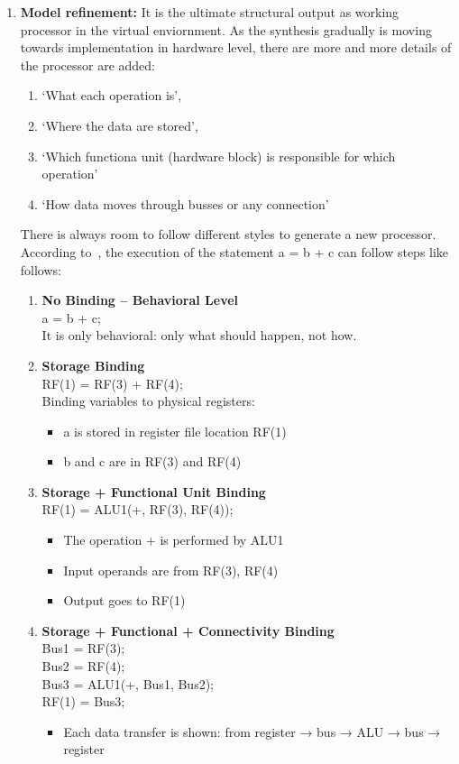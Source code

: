 \begin{enumerate}[label=(\alph*)]
    \item \textbf{Model refinement:} It is the ultimate structural output as working processor in the virtual enviornment. As the synthesis gradually is moving towards implementation in hardware level, there are more and more details of the processor are added:
    \begin{enumerate}
        \item `What each operation is',
        \item `Where the data are stored',
        \item `Which functiona unit (hardware block) is responsible for which operation'
        \item `How data moves through busses or any connection'
    \end{enumerate}
    There is always room to follow different styles to generate a new processor. According to~\cite{Gajski.2009}, the execution of the statement a = b + c can follow steps like follows:  
    \begin{enumerate}
        \item \textbf{No Binding – Behavioral Level}\\
        a = b + c;\\
        It is only behavioral: only what should happen, not how. 
        \item \textbf{Storage Binding}\\
        RF(1) = RF(3) + RF(4);\\
        Binding variables to physical registers:
            \begin{itemize}
                \item a is stored in register file location RF(1)
                \item b and c are in RF(3) and RF(4)
            \end{itemize}
        \item \textbf{Storage + Functional Unit Binding}\\
        RF(1) = ALU1(+, RF(3), RF(4));
            \begin{itemize}
                \item The operation + is performed by ALU1
                \item Input operands are from RF(3), RF(4)
                \item Output goes to RF(1)
            \end{itemize}
        \item \textbf{Storage + Functional + Connectivity Binding}\\
        Bus1 = RF(3);\\
        Bus2 = RF(4);\\
        Bus3 = ALU1(+, Bus1, Bus2);\\
        RF(1) = Bus3;
            \begin{itemize}
                \item Each data transfer is shown: from register → bus → ALU → bus → register
            \end{itemize}
    \end{enumerate}
\end{enumerate}  



